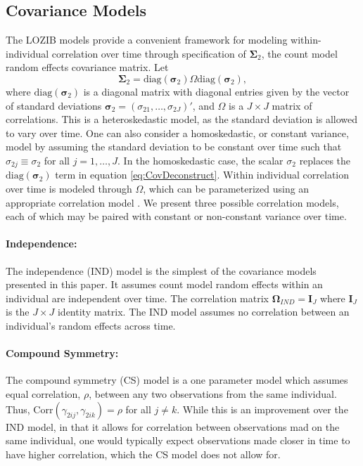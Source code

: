 \documentclass[12pt]{article}
\begin{document}
\subsection{Covariance Models}
The LOZIB models provide a convenient framework for modeling within-individual correlation over time through specification of $\bm{\Sigma}_{2}$, the count model random effects covariance matrix. Let 
\begin{equation}
	\bm{\Sigma}_{2} = \text{diag}(\bm{\sigma}_{2}) \Omega \text{diag}(\bm{\sigma}_{2}),
	\label{eq:CovDeconstruct}
\end{equation}
where $\text{diag}(\bm{\sigma}_{2})$ is a diagonal matrix with diagonal entries given by the vector of standard deviations $\bm{\sigma}_{2} = (\sigma_{21}, \dots, \sigma_{2J})'$, and $\Omega$ is a $J \times J$ matrix of correlations. This is a heteroskedastic model, as the standard deviation is allowed to vary over time. One can also consider a homoskedastic, or constant variance, model by assuming the standard deviation to be constant over time such that $\sigma_{2j} \equiv \sigma_{2}$ for all $j=1, \dots, J$. In the homoskedastic case, the scalar $\sigma_{2}$ replaces the $\text{diag}(\bm{\sigma}_{2})$ term in equation \eqref{eq:CovDeconstruct}. Within individual correlation over time is modeled through $\Omega$, which can be parameterized using an appropriate correlation model \citep{liechty2004bayesian, weiss2005modeling}. We present three possible correlation models, each of which may be paired with constant or non-constant variance over time.

\paragraph{Independence:}
The independence (IND) model is the simplest of the covariance models presented in this paper. It assumes count model random effects within an individual are independent over time. The correlation matrix $\bm{\Omega}_{IND} = \bm{I}_{J}$ where $\bm{I}_{J}$ is the $J \times J$ identity matrix. The IND model assumes no correlation between an individual's random effects across time.

\paragraph{Compound Symmetry:}
The compound symmetry (CS) model is a one parameter model which assumes equal correlation, $\rho$, between any two observations from the same individual. Thus, Corr$(\gamma_{2ij}, \gamma_{2ik}) = \rho$ for all $j \neq k$. While this is an improvement over the IND model, in that it allows for correlation between observations mad on the same individual, one would typically expect observations made closer in time to have higher correlation, which the CS model does not allow for. 
\end{document}
